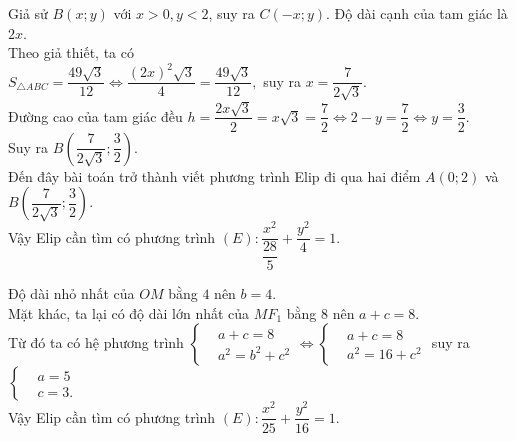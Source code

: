 \begin{bt}
{\begin{listEX}
		Giả sử $B(x;y)$ với $x>0,y<2$, suy ra $C(-x;y)$. Độ dài cạnh của tam giác là $2x$.\\
		Theo giả thiết, ta có\\
		$S_{\triangle ABC}=\dfrac{49\sqrt{3}}{12} \Leftrightarrow \dfrac{(2x)^2\sqrt{3}}{4}=\dfrac{49\sqrt{3}}{12},$ suy ra $x=\dfrac{7}{2\sqrt{3}}$.\\
		Đường cao của tam giác đều
		$h=\dfrac{2x\sqrt{3}}{2}=x\sqrt{3}=\dfrac{7}{2} \Leftrightarrow 2-y=\dfrac{7}{2} \Leftrightarrow y=\dfrac{3}{2}$.\\
		Suy ra $B\left(\dfrac{7}{2\sqrt{3}};\dfrac{3}{2}\right)$.\\
		Đến đây bài toán trở thành viết phương trình Elip đi qua hai điểm $A(0;2)$ và $B\left(\dfrac{7}{2\sqrt{3}};\dfrac{3}{2}\right)$.\\
		Vậy Elip cần tìm có phương trình $(E)\colon \dfrac{x^2}{\dfrac{28}{5}}+\dfrac{y^2}{4}=1$.
		\item Độ dài nhỏ nhất của $OM$ bằng $4$ nên $b=4$.\\
		Mặt khác, ta lại có độ dài lớn nhất của $MF_1$ bằng $8$ nên $a+c=8$.\\
		Từ đó ta có hệ phương trình $\left\{\begin{aligned}
		&a+c=8\\
		&a^2=b^2+c^2
		\end{aligned}\right. \Leftrightarrow \left\{\begin{aligned}
		&a+c=8\\
		&a^2=16+c^2
		\end{aligned}\right. $ suy ra $\left\{\begin{aligned}
		&a=5\\
		&c=3.
		\end{aligned}\right. $\\
		Vậy Elip cần tìm có phương trình $(E)\colon \dfrac{x^2}{25}+\dfrac{y^2}{16}=1$.
	\end{listEX}
}
\end{bt}


